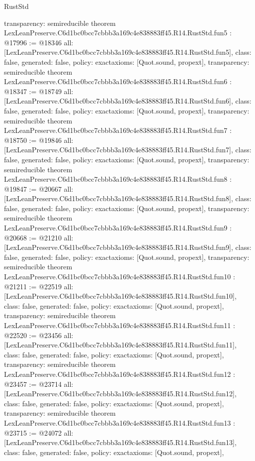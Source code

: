 \begin{lexlean}{RustStd}
\begin{coremodule}
{  transparency: semireducible
}
theorem LexLeanPreserve.C6d1bc0bcc7cbbb3a169c4e838883ff45.R14.RustStd.fun5 : @17996 := @18346 {
  all: [LexLeanPreserve.C6d1bc0bcc7cbbb3a169c4e838883ff45.R14.RustStd.fun5],
  class: false,
  generated: false,
  policy: exact{axioms: [Quot.sound, propext]},
  transparency: semireducible
}
theorem LexLeanPreserve.C6d1bc0bcc7cbbb3a169c4e838883ff45.R14.RustStd.fun6 : @18347 := @18749 {
  all: [LexLeanPreserve.C6d1bc0bcc7cbbb3a169c4e838883ff45.R14.RustStd.fun6],
  class: false,
  generated: false,
  policy: exact{axioms: [Quot.sound, propext]},
  transparency: semireducible
}
theorem LexLeanPreserve.C6d1bc0bcc7cbbb3a169c4e838883ff45.R14.RustStd.fun7 : @18750 := @19846 {
  all: [LexLeanPreserve.C6d1bc0bcc7cbbb3a169c4e838883ff45.R14.RustStd.fun7],
  class: false,
  generated: false,
  policy: exact{axioms: [Quot.sound, propext]},
  transparency: semireducible
}
theorem LexLeanPreserve.C6d1bc0bcc7cbbb3a169c4e838883ff45.R14.RustStd.fun8 : @19847 := @20667 {
  all: [LexLeanPreserve.C6d1bc0bcc7cbbb3a169c4e838883ff45.R14.RustStd.fun8],
  class: false,
  generated: false,
  policy: exact{axioms: [Quot.sound, propext]},
  transparency: semireducible
}
theorem LexLeanPreserve.C6d1bc0bcc7cbbb3a169c4e838883ff45.R14.RustStd.fun9 : @20668 := @21210 {
  all: [LexLeanPreserve.C6d1bc0bcc7cbbb3a169c4e838883ff45.R14.RustStd.fun9],
  class: false,
  generated: false,
  policy: exact{axioms: [Quot.sound, propext]},
  transparency: semireducible
}
theorem LexLeanPreserve.C6d1bc0bcc7cbbb3a169c4e838883ff45.R14.RustStd.fun10 : @21211 := @22519 {
  all: [LexLeanPreserve.C6d1bc0bcc7cbbb3a169c4e838883ff45.R14.RustStd.fun10],
  class: false,
  generated: false,
  policy: exact{axioms: [Quot.sound, propext]},
  transparency: semireducible
}
theorem LexLeanPreserve.C6d1bc0bcc7cbbb3a169c4e838883ff45.R14.RustStd.fun11 : @22520 := @23456 {
  all: [LexLeanPreserve.C6d1bc0bcc7cbbb3a169c4e838883ff45.R14.RustStd.fun11],
  class: false,
  generated: false,
  policy: exact{axioms: [Quot.sound, propext]},
  transparency: semireducible
}
theorem LexLeanPreserve.C6d1bc0bcc7cbbb3a169c4e838883ff45.R14.RustStd.fun12 : @23457 := @23714 {
  all: [LexLeanPreserve.C6d1bc0bcc7cbbb3a169c4e838883ff45.R14.RustStd.fun12],
  class: false,
  generated: false,
  policy: exact{axioms: [Quot.sound, propext]},
  transparency: semireducible
}
theorem LexLeanPreserve.C6d1bc0bcc7cbbb3a169c4e838883ff45.R14.RustStd.fun13 : @23715 := @24072 {
  all: [LexLeanPreserve.C6d1bc0bcc7cbbb3a169c4e838883ff45.R14.RustStd.fun13],
  class: false,
  generated: false,
  policy: exact{axioms: [Quot.sound, propext]},
}
\end{coremodule}
\end{lexlean}
